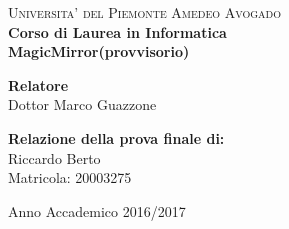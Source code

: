 \begin{titlepage}
\begin{center}

\textsc{\Large Universita' del Piemonte Amedeo Avogado}\\[0.7cm]

{\normalsize \bf Corso di Laurea in Informatica}\\[1cm]


{\Large \bfseries MagicMirror(provvisorio)}\\[1cm]

\begin{minipage}[t]{0.4\textwidth}
\vspace{0.5cm}
\flushleft
{\bf Relatore}\\
Dottor Marco Guazzone\\
\end{minipage}
\begin{minipage}[t]{0.4\textwidth}
  \vspace{2.5cm}
\vfill
\flushright
{\bf Relazione della prova finale di:}\\
Riccardo Berto\\
Matricola: 20003275
\end{minipage}
\vfill
\vspace{0.5cm}
{\large Anno Accademico 2016/2017}
\vfill
\end{center}
\end{titlepage}

